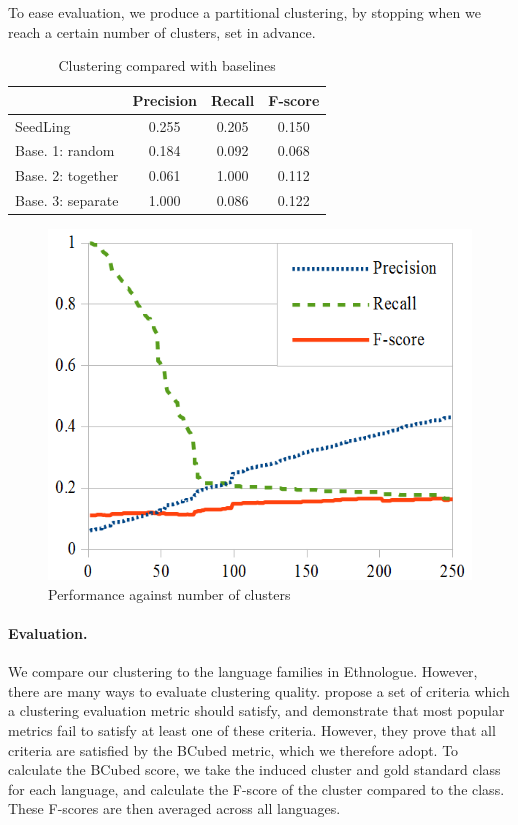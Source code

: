 To ease evaluation, we produce a partitional clustering, by stopping when we reach a certain number of clusters, set in advance.

\begin{table}[t]
\centering
    \begin{tabular}{l|ccc}
    ~        & Precision & Recall       & F-score \\ \hline
	SeedLing	& 0.255	& 0.205	& 0.150 \\ \hline
	Base. 1: random	& 0.184	& 0.092	& 0.068 \\
	Base. 2: together	& 0.061	& 1.000	& 0.112 \\
	Base. 3: separate	& 1.000	& 0.086	& 0.122
    \end{tabular}
\caption{Clustering compared with baselines}
\label{table:cluster}
\end{table}

\begin{figure}[t]
\begin{centering}
\includegraphics[scale=0.75]{performance.png}
\caption{Performance against number of clusters}
\label{fig:performance}
\end{centering}
\end{figure}

\paragraph{Evaluation.}
We compare our clustering to the language families in Ethnologue. However, there are many ways to evaluate clustering quality.  propose a set of criteria which a clustering evaluation metric should satisfy, and demonstrate that most popular metrics fail to satisfy at least one of these criteria.  However, they prove that all criteria are satisfied by the BCubed metric, which we therefore adopt.  To calculate the BCubed score, we take the induced cluster and gold standard class for each language, and calculate the F-score of the cluster compared to the class.  These F-scores are then averaged across all languages.

